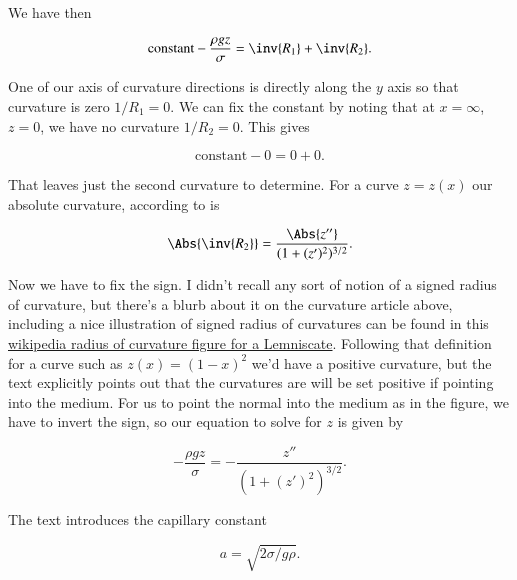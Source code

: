 \begin{Answer}[ref={problem:fluids:review:q3}]
We have then

\begin{equation}\label{eqn:continuumFluidsReview:1590}
\text{constant} -\frac{\rho g z}{\sigma} = \inv{R_1} + \inv{R_2}.
\end{equation}

One of our axis of curvature directions is directly along the $y$ axis so that curvature is zero $1/R_1 = 0$.  We can fix the constant by noting that at $x = \infty$, $z = 0$, we have no curvature $1/R_2 = 0$.  This gives

\begin{equation}\label{eqn:continuumFluidsReview:1690}
\text{constant} -0 = 0 + 0.
\end{equation}

That leaves just the second curvature to determine.  For a curve $z = z(x)$ our absolute curvature, according to \cite{wiki:curvature} is

\begin{equation}\label{eqn:continuumFluidsReview:1610}
\Abs{\inv{R_2}} = \frac{\Abs{z''}}{(1 + (z')^2)^{3/2}}.
\end{equation}

Now we have to fix the sign.  I didn't recall any sort of notion of a signed radius of curvature, but there's a blurb about it on the curvature article above, including a nice illustration of signed radius of curvatures can be found in this \href{http://goo.gl/Wqzz2}{wikipedia radius of curvature figure for a Lemniscate}.  Following that definition for a curve such as $z(x) = (1-x)^2$ we'd have a positive curvature, but the text explicitly points out that the curvatures are will be set positive if pointing into the medium.  For us to point the normal into the medium as in the figure, we have to invert the sign, so our equation to solve for $z$ is given by

\begin{equation}\label{eqn:continuumFluidsReview:1710}
-\frac{\rho g z}{\sigma} = -\frac{z''}{(1 + (z')^2)^{3/2}}.
\end{equation}

The text introduces the capillary constant

\begin{equation}\label{eqn:continuumFluidsReview:1730}
a = \sqrt{2 \sigma/ g \rho}.
\end{equation}


\end{Answer}
